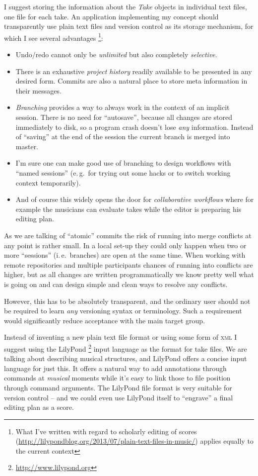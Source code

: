 \documentclass[11pt,a4paper]{article}
\begin{document}
I suggest storing the information about the \emph{Take} objects in individual text files, one file for each take.
An application implementing my concept should transparently use plain text files and version control as its storage mechanism, for which I see several advantages%
\footnote{What I've written with regard to scholarly editing of scores (\url{http://lilypondblog.org/2013/07/plain-text-files-in-music/}) applies equally to the current context}:
\begin{itemize}
\item Undo/redo cannot only be \emph{unlimited} but also completely \emph{selective}.
\item There is an exhaustive \emph{project history} readily available to be presented in any desired form.
Commits are also a natural place to store meta information in their messages.
\item \emph{Branching} provides a way to always work in the context of an implicit session.
There is no need for “autosave”, because all changes are stored immediately to disk, so a program crash doesn't lose \emph{any} information.
Instead of “saving” at the end of the session the current branch is merged into master.
\item I'm sure one can make good use of branching to design workflows with “named sessions” (e.\,g.\ for trying out some hacks or to switch working context temporarily).
\item And of course this widely opens the door for \emph{collaborative workflows} where for example the musicians can evaluate takes while the editor is preparing his editing plan.
\end{itemize}

As we are talking of “atomic” commits the risk of running into merge conflicts at any point is rather small.
In a local set-up they could only happen when two or more “sessions” (i.\,e.\ branches) are open at the same time.
When working with remote repositories and multiple participants chances of running into conflicts are higher, but as all changes are written programmatically we know pretty well what is going on and can design simple and clean ways to resolve any conflicts.

However, this has to be absolutely transparent, and the ordinary user should not be required to learn \emph{any} versioning syntax or terminology.
Such a requirement would significantly reduce acceptance with the main target group.

\medskip
Instead of inventing a new plain text file format or using some form of \textsc{xml} I suggest using the LilyPond%
\footnote{\url{http://www.lilypond.org}}
input language as the format for take files.
We are talking about describing musical structures, and LilyPond offers a concise input language for just this.
It offers a natural way to add annotations through commands at \emph{musical} moments while it's easy to link those to file position through command arguments.
The LilyPond file format is very suitable for version control -- and we could even use LilyPond itself to “engrave” a final editing plan as a score.
\end{document}
